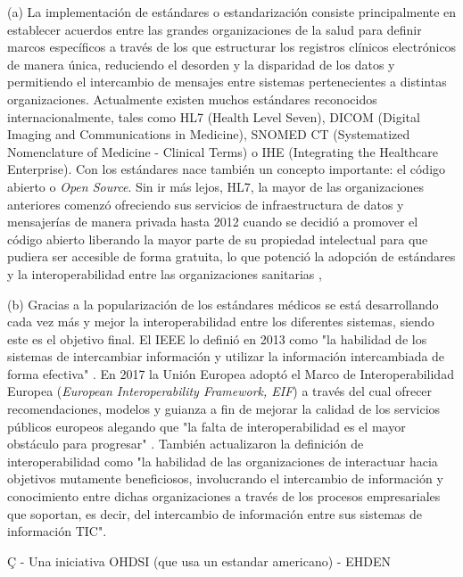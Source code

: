 (a) La implementación de estándares o estandarización consiste principalmente en establecer acuerdos entre las grandes organizaciones de la salud para definir marcos específicos a través de los que estructurar los registros clínicos electrónicos de manera única, reduciendo el desorden y la disparidad de los datos y permitiendo el intercambio de mensajes entre sistemas pertenecientes a distintas organizaciones. Actualmente existen muchos estándares reconocidos internacionalmente, tales como HL7 (Health Level Seven), DICOM (Digital Imaging and Communications in Medicine), SNOMED CT (Systematized Nomenclature of Medicine - Clinical Terms) o IHE (Integrating the Healthcare Enterprise). Con los estándares nace también un concepto importante: el código abierto o \textit{Open Source}. Sin ir más lejos, HL7, la mayor de las organizaciones anteriores comenzó ofreciendo sus servicios de infraestructura de datos y mensajerías de manera privada hasta 2012 cuando se decidió a promover el código abierto liberando la mayor parte de su propiedad intelectual para que pudiera ser accesible de forma gratuita, lo que potenció la adopción de estándares y la interoperabilidad entre las organizaciones sanitarias \cite{berryman2013data},

(b) Gracias a la popularización de los estándares médicos se está desarrollando cada vez más y mejor la interoperabilidad entre los diferentes sistemas, siendo este es el objetivo final. El IEEE lo definió en 2013 como "la habilidad de los sistemas de intercambiar información y utilizar la información intercambiada de forma efectiva" \cite{berryman2013data}. En 2017 la Unión Europea adoptó el Marco de Interoperabilidad Europea (\textit{European Interoperability Framework, EIF}) a través del cual ofrecer recomendaciones, modelos y guianza a fin de mejorar la calidad de los servicios públicos europeos  alegando que "la falta de interoperabilidad es el mayor obstáculo para progresar" \cite{kouroubali2019new}. También actualizaron la definición de interoperabilidad como "la habilidad de las organizaciones de interactuar hacia objetivos mutamente beneficiosos, involucrando el intercambio de información y conocimiento entre dichas organizaciones a través de los procesos empresariales que soportan, es decir, del intercambio de información entre sus sistemas de información TIC".



  Ç
    - Una iniciativa OHDSI (que usa un estandar americano) - EHDEN\\

